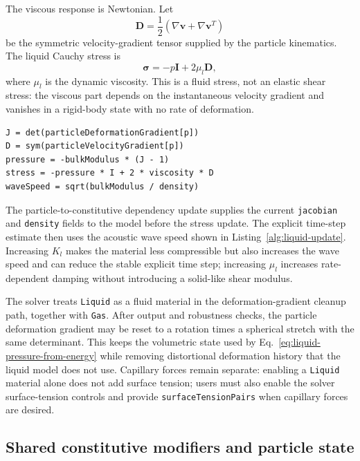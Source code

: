 The viscous response is Newtonian.  Let
\begin{equation}
  \mathbf{D}=\frac{1}{2}\left(\nabla\mathbf{v}+\nabla\mathbf{v}^{T}\right)
  \label{eq:liquid-rate-of-deformation}
\end{equation}
be the symmetric velocity-gradient tensor supplied by the particle kinematics.  The liquid Cauchy stress is
\begin{equation}
  \boldsymbol{\sigma}=-p\mathbf{I}+2\mu_l\mathbf{D},
  \label{eq:liquid-stress}
\end{equation}
where \(\mu_l\) is the dynamic viscosity.  This is a fluid stress, not an elastic shear stress: the viscous part depends on the instantaneous velocity gradient and vanishes in a rigid-body state with no rate of deformation.

\begin{lstlisting}[caption={Liquid stress update.},label={alg:liquid-update},basicstyle=\ttfamily\small]
J = det(particleDeformationGradient[p])
D = sym(particleVelocityGradient[p])
pressure = -bulkModulus * (J - 1)
stress = -pressure * I + 2 * viscosity * D
waveSpeed = sqrt(bulkModulus / density)
\end{lstlisting}

The particle-to-constitutive dependency update supplies the current \texttt{jacobian} and \texttt{density} fields to the model before the stress update.  The explicit time-step estimate then uses the acoustic wave speed shown in Listing~\ref{alg:liquid-update}.  Increasing \(K_l\) makes the material less compressible but also increases the wave speed and can reduce the stable explicit time step; increasing \(\mu_l\) increases rate-dependent damping without introducing a solid-like shear modulus.

The solver treats \texttt{Liquid} as a fluid material in the deformation-gradient cleanup path, together with \texttt{Gas}.  After output and robustness checks, the particle deformation gradient may be reset to a rotation times a spherical stretch with the same determinant.  This keeps the volumetric state used by Eq.~\eqref{eq:liquid-pressure-from-energy} while removing distortional deformation history that the liquid model does not use.  Capillary forces remain separate: enabling a \texttt{Liquid} material alone does not add surface tension; users must also enable the solver surface-tension controls and provide \texttt{surfaceTensionPairs} when capillary forces are desired.

\subsection{Shared constitutive modifiers and particle state}
\label{subsec:constitutive-modifiers}

